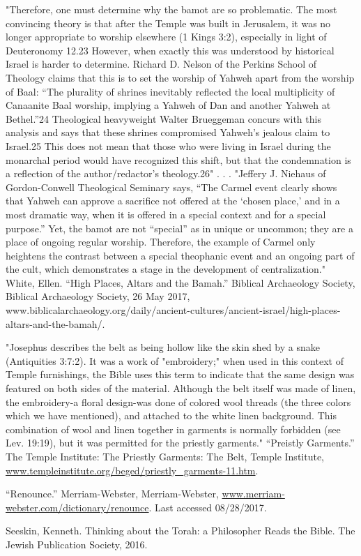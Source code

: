 \documentclass[11pt]{article}
\begin{document}
\begin{thebibliography}{37}
"Therefore, one must determine why the bamot are so problematic. The most convincing theory is that after the Temple was built in Jerusalem, it was no longer appropriate to worship elsewhere (1 Kings 3:2), especially in light of Deuteronomy 12.23 However, when exactly this was understood by historical Israel is harder to determine. Richard D. Nelson of the Perkins School of Theology claims that this is to set the worship of Yahweh apart from the worship of Baal: “The plurality of shrines inevitably reflected the local multiplicity of Canaanite Baal worship, implying a Yahweh of Dan and another Yahweh at Bethel.”24 Theological heavyweight Walter Brueggeman concurs with this analysis and says that these shrines compromised Yahweh’s jealous claim to Israel.25 This does not mean that those who were living in Israel during the monarchal period would have recognized this shift, but that the condemnation is a reflection of the author/redactor’s theology.26"
. . . 
"Jeffery J. Niehaus of Gordon-Conwell Theological Seminary says, “The Carmel event clearly shows that Yahweh can approve a sacrifice not offered at the ‘chosen place,’ and in a most dramatic way, when it is offered in a special context and for a special purpose.” Yet, the bamot are not “special” as in unique or uncommon; they are a place of ongoing regular worship. Therefore, the example of Carmel only heightens the contrast between a special theophanic event and an ongoing part of the cult, which demonstrates a stage in the development of centralization."
White, Ellen. “High Places, Altars and the Bamah.” Biblical Archaeology Society, Biblical Archaeology Society, 26 May 2017, www.biblicalarchaeology.org/daily/ancient-cultures/ancient-israel/high-places-altars-and-the-bamah/.

"Josephus describes the belt as being hollow like the skin shed by a snake (Antiquities 3:7:2). It was a work of "embroidery;" when used in this context of Temple furnishings, the Bible uses this term to indicate that the same design was featured on both sides of the material. Although the belt itself was made of linen, the embroidery-a floral design-was done of colored wool threads (the three colors which we have mentioned), and attached to the white linen background. This combination of wool and linen together in garments is normally forbidden (see Lev. 19:19), but it was permitted for the priestly garments."
“Preistly Garments.” The Temple Institute: The Priestly Garments: The Belt, Temple Institute, \url{www.templeinstitute.org/beged/priestly_garments-11.htm}.


“Renounce.” Merriam-Webster, Merriam-Webster, \url{www.merriam-webster.com/dictionary/renounce}. Last accessed 08/28/2017.

Seeskin, Kenneth. Thinking about the Torah: a Philosopher Reads the Bible. The Jewish Publication Society, 2016.
\end{thebibliography}
\end{document}
